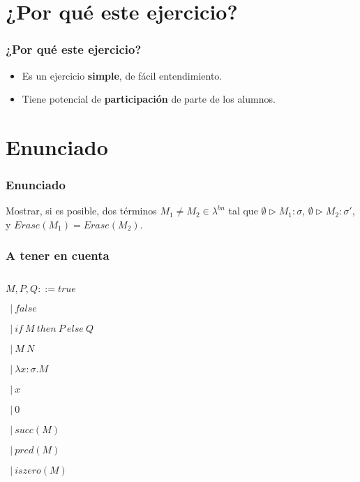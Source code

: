 \documentclass{beamer}
\begin{document}
\section{¿Por qué este ejercicio?}
\begin{frame}
\frametitle{¿Por qué este ejercicio?}
\begin{itemize}
    \item Es un ejercicio \textbf{simple},
        de fácil entendimiento.
    \item Tiene potencial de \textbf{participación}
        de parte de los alumnos.
\end{itemize}

\end{frame}

\section{Enunciado}
\begin{frame}
\frametitle{Enunciado}
Mostrar, si es posible, dos términos
$M_1 \neq M_2 \in \lambda^{bn}$ tal que
$\emptyset \triangleright M_1 : \sigma$,
$\emptyset \triangleright M_2 : \sigma'$,
y $Erase(M_1) = Erase(M_2)$.
\end{frame}

\begin{frame}
\frametitle{A tener en cuenta}

\begin{columns}

\begin{column}{0.5\textwidth}
$M, P, Q ::= true$

\qquad\qquad$\ \ |\ false$

\qquad\qquad$\ \ |\ if\ M\ then\ P\ else\ Q$

\qquad\qquad$\ \ |\ M\ N$

\qquad\qquad$\ \ |\ \lambda x : \sigma.M$

\qquad\qquad$\ \ |\ x$

\qquad\qquad$\ \ |\ 0$

\qquad\qquad$\ \ |\ succ(M)$

\qquad\qquad$\ \ |\ pred(M)$

\qquad\qquad$\ \ |\ iszero(M)$
\end{column}

\begin{column}{0.5\textwidth}
\end{column}

\end{columns}
\end{frame}
\end{document}
